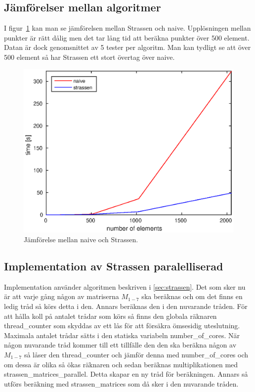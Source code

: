 \subsection{Jämförelser mellan algoritmer}
I figur~\ref{fig:comparison} kan man se jämförelsen mellan Strassen och naive. Upplösningen mellan punkter är rätt dålig men det tar lång tid att beräkna punkter över 500 element. Datan är dock genomsnittet av 5 tester per algoritm. Man kan tydligt se att över 500 element så har Strassen ett stort övertag över naive. 

\begin{figure}[H]
	\begin{center}
		\includegraphics[scale=0.6]{martin-tex/comparison.eps}
	\end{center}
	\caption{Jämförelse mellan naive och Strassen.}
	\label{fig:comparison}
\end{figure}

\subsection{Implementation av Strassen paralelliserad}
Implementation använder algoritmen beskriven i \ref{sec:strassen}. Det som sker nu är att varje gång någon av matriserna $M_{1-7}$ ska beräknas och om det finns en ledig tråd så körs detta i den. Annars beräknas den i den nuvarande tråden. För att hålla koll på antalet trådar som körs så finns den globala räknaren thread\_counter som skyddas av ett lås för att försäkra ömsesidig uteslutning. Maximala antalet trådar sätts i den statiska variabeln number\_of\_cores. När någon nuvarande tråd kommer till ett tillfälle den den ska beräkna någon av 
$M_{1-7}$ så låser den thread\_counter och jämför denna med number\_of\_cores och om dessa är olika så ökas räknaren och sedan beräknas multiplikationen med strassen\_matrices\_parallel. Detta skapar en ny tråd för beräkningen. Annars så utförs beräkning med strassen\_matrices som då sker i den nuvarande tråden.


